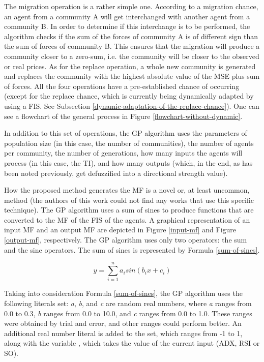 The migration operation is a rather simple one. According to a migration chance, an agent from a community A will get interchanged with another agent from a community B. In order to determine if this interchange is to be performed, the algorithm checks if the sum of the forces of community A is of different sign than the sum of forces of community B. This ensures that the migration will produce a community closer to a zero-sum, i.e. the community will be closer to the observed or real prices. As for the replace operation, a whole new community is generated and replaces the community with the highest absolute value of the MSE plus sum of forces. All the four operations have a pre-established chance of occurring (except for the replace chance, which is currently being dynamically adapted by using a FIS. See Subsection \ref{dynamic-adaptation-of-the-replace-chance}). One can see a flowchart of the general process in Figure \ref{flowchart-without-dynamic}.

In addition to this set of operations, the GP algorithm uses the parameters of population size (in this case, the number of communities), the number of agents per community, the number of generations, how many inputs the agents will process (in this case, the TI), and how many outputs (which, in the end, as has been noted previously, get defuzzified into a directional strength value).

How the proposed method generates the MF is a novel or, at least uncommon, method (the authors of this work could not find any works that use this specific technique). The GP algorithm uses a sum of sines to produce functions that are converted to the MF of the FIS of the agents. A graphical representation of an input MF and an output MF are depicted in Figure \ref{input-mf} and Figure \ref{output-mf}, respectively. The GP algorithm uses only two operators: the sum and the sine operators. The sum of sines is represented by Formula \ref{sum-of-sines}.

\begin{equation} \label{sum-of-sines}
  y = \sum_{i=1}^{n} a_{i} sin(b_{i}x + c_{i})
\end{equation}

Taking into consideration Formula \ref{sum-of-sines}, the GP algorithm uses the following literals set: \textit{a}, \textit{b}, and \textit{c} are random real numbers, where \textit{a} ranges from 0.0 to 0.3, \textit{b} ranges from 0.0 to 10.0, and \textit{c} ranges from 0.0 to 1.0. These ranges were obtained by trial and error, and other ranges could perform better. An additional real number literal is added to the set, which ranges from -1 to 1, along with the variable , which takes the value of the current input (ADX, RSI or SO).

